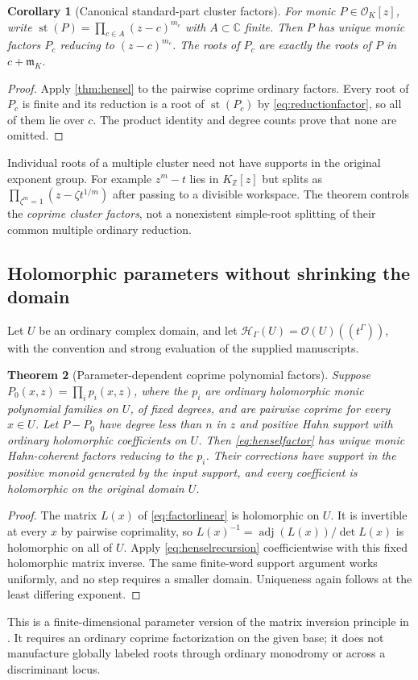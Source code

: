 \documentclass[11pt,letterpaper]{article}
\numberwithin{equation}{section}
\newtheorem{theorem}{Theorem}[section]
\newtheorem{corollary}[theorem]{Corollary}
\theoremstyle{definition}
\theoremstyle{remark}\newtheorem{remark}[theorem]{Remark}
\newcommand{\C}{\mathbb C}
\newcommand{\Z}{\mathbb Z}
\newcommand{\OO}{\mathcal O}
\newcommand{\mm}{\mathfrak m}
\newcommand{\HH}{\mathscr H_\Gamma}
\newcommand{\st}{\operatorname{st}}
\begin{document}
\begin{corollary}[Canonical standard-part cluster factors]\label{cor:clusterfactor}
For monic $P\in\OO_K[z]$, write
$\st(P)=\prod_{c\in A}(z-c)^{m_c}$ with $A\subset\C$ finite.
Then $P$ has unique monic factors $P_c$ reducing to $(z-c)^{m_c}$.
The roots of $P_c$ are exactly the roots of $P$ in $c+\mm_K$.
\end{corollary}
\begin{proof}
Apply \cref{thm:hensel} to the pairwise coprime ordinary factors.
Every root of $P_c$ is finite and its reduction is a root of
$\st(P_c)$ by \eqref{eq:reductionfactor}, so all of them lie over $c$.
The product identity and degree counts prove that none are omitted.
\end{proof}
Individual roots of a multiple cluster need not have supports in the
original exponent group. For example $z^m-t$ lies in $K_\Z[z]$ but
splits as $\prod_{\zeta^m=1}(z-\zeta t^{1/m})$ after passing to a
divisible workspace. The theorem controls the \emph{coprime cluster
factors}, not a nonexistent simple-root splitting of their common
multiple ordinary reduction.

\subsection{Holomorphic parameters without shrinking the domain}
Let $U$ be an ordinary complex domain, and let
$\HH(U)=\OO(U)((t^\Gamma))$, with the convention and strong evaluation
of the supplied manuscripts.

\begin{theorem}[Parameter-dependent coprime polynomial factors]
\label{thm:parameterhensel}
Suppose $P_0(x,z)=\prod_ip_i(x,z)$, where the $p_i$ are ordinary
holomorphic monic polynomial families on $U$, of fixed degrees, and
are pairwise coprime for every $x\in U$. Let $P-P_0$ have degree less
than $n$ in $z$ and positive Hahn support with ordinary holomorphic
coefficients on $U$. Then \eqref{eq:henselfactor} has unique monic
Hahn-coherent factors reducing to the $p_i$. Their corrections have
support in the positive monoid generated by the input support, and
every coefficient is holomorphic on the original domain $U$.
\end{theorem}
\begin{proof}
The matrix $L(x)$ of \eqref{eq:factorlinear} is holomorphic on $U$.
It is invertible at every $x$ by pairwise coprimality, so
$L(x)^{-1}=\operatorname{adj}(L(x))/\det L(x)$ is holomorphic on all
of $U$. Apply \eqref{eq:henselrecursion} coefficientwise with this fixed
holomorphic matrix inverse. The same finite-word support argument
works uniformly, and no step requires a smaller domain. Uniqueness
again follows at the least differing exponent.
\end{proof}
This is a finite-dimensional parameter version of the matrix inversion
principle in \cite{SourceResearch}. It requires an ordinary coprime
factorization on the given base; it does not manufacture globally
labeled roots through ordinary monodromy or across a discriminant locus.
\end{document}

